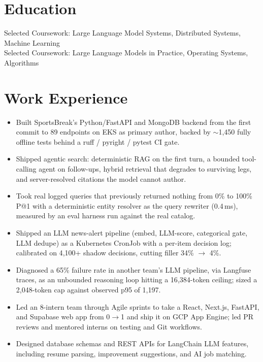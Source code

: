 \documentclass[11pt, letterpaper]{article}
\begin{document}

\section{Education}
Selected Coursework: Large Language Model Systems, Distributed Systems, Machine Learning\\[1pt]
Selected Coursework: Large Language Models in Practice, Operating Systems, Algorithms

\section{Work Experience}
\begin{itemize}
  \item Built SportsBreak's Python/FastAPI and MongoDB backend from the first commit to 89 endpoints on EKS as primary author, backed by $\sim$1{,}450 fully offline tests behind a ruff / pyright / pytest CI gate.
  \item Shipped agentic search: deterministic RAG on the first turn, a bounded tool-calling agent on follow-ups, hybrid retrieval that degrades to surviving legs, and server-resolved citations the model cannot author.
  \item Took real logged queries that previously returned nothing from 0\% to 100\% P@1 with a deterministic entity resolver as the query rewriter (0.4\,ms), measured by an eval harness run against the real catalog.
  \item Shipped an LLM news-alert pipeline (embed, LLM-score, categorical gate, LLM dedupe) as a Kubernetes CronJob with a per-item decision log; calibrated on 4{,}100+ shadow decisions, cutting filler 34\% $\rightarrow$ 4\%.
  \item Diagnosed a 65\% failure rate in another team's LLM pipeline, via Langfuse traces, as an unbounded reasoning loop hitting a 16{,}384-token ceiling; sized a 2{,}048-token cap against observed p95 of 1{,}197.
\end{itemize}

\begin{itemize}
  \item Led an 8-intern team through Agile sprints to take a React, Next.js, FastAPI, and Supabase web app from 0$\rightarrow$1 and ship it on GCP App Engine; led PR reviews and mentored interns on testing and Git workflows.
  \item Designed database schemas and REST APIs for LangChain LLM features, including resume parsing, improvement suggestions, and AI job matching.
\end{itemize}
\end{document}
